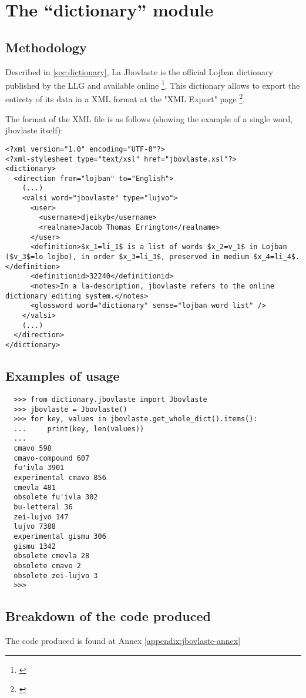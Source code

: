 \chapter{The ``dictionary'' module}
\label{chap:creating_a_dictionary}

\section{Methodology}

Described in \ref{sec:dictionary}, La Jbovlaste is the official Lojban dictionary published by the LLG and available online \footnote{\cite{jbovlaste}}.
This dictionary allows to export the entirety of its data in a XML format at the "XML Export" page \footnote{\cite{jbovlaste-export}}.\\

\newpage

The format of the XML file is as follows (showing the example of a single word, jbovlaste itself): \\

\begin{lstlisting}
<?xml version="1.0" encoding="UTF-8"?>
<?xml-stylesheet type="text/xsl" href="jbovlaste.xsl"?>
<dictionary>
  <direction from="lojban" to="English">
    (...)
    <valsi word="jbovlaste" type="lujvo">
      <user>
        <username>djeikyb</username>
        <realname>Jacob Thomas Errington</realname>
      </user>
      <definition>$x_1=li_1$ is a list of words $x_2=v_1$ in Lojban ($v_3$=lo lojbo), in order $x_3=li_3$, preserved in medium $x_4=li_4$.</definition>
      <definitionid>32240</definitionid>
      <notes>In a la-description, jbovlaste refers to the online dictionary editing system.</notes>
      <glossword word="dictionary" sense="lojban word list" />
    </valsi>
    (...)
  </direction>
</dictionary>
\end{lstlisting}

\section{Examples of usage}

\begin{lstlisting}
  >>> from dictionary.jbovlaste import Jbovlaste
  >>> jbovlaste = Jbovlaste()
  >>> for key, values in jbovlaste.get_whole_dict().items():
  ...     print(key, len(values))
  ...
  cmavo 598
  cmavo-compound 607
  fu'ivla 3901
  experimental cmavo 856
  cmevla 481
  obsolete fu'ivla 302
  bu-letteral 36
  zei-lujvo 147
  lujvo 7388
  experimental gismu 306
  gismu 1342
  obsolete cmevla 28
  obsolete cmavo 2
  obsolete zei-lujvo 3
  >>>
  \end{lstlisting}

\section{Breakdown of the code produced}

The code produced is found at Annex \ref{appendix:jbovlaste-annex}